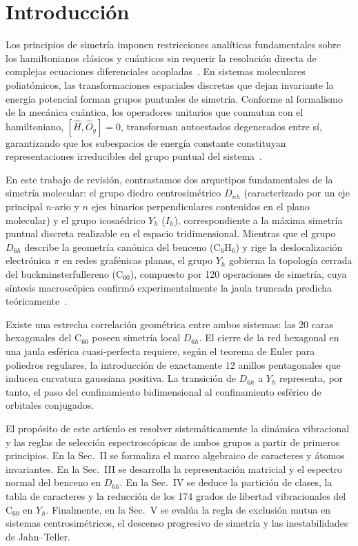 \enlargethispage{1.5\baselineskip}

\section{Introducción}
\label{sec:intro}
Los principios de simetría imponen restricciones analíticas fundamentales sobre los hamiltonianos clásicos y cuánticos sin requerir la resolución directa de complejas ecuaciones diferenciales acopladas~\cite{Ramadevi2019, LandauMechanics}. En sistemas moleculares poliatómicos, las transformaciones espaciales discretas que dejan invariante la energía potencial forman grupos puntuales de simetría. Conforme al formalismo de la mecánica cuántica, los operadores unitarios que conmutan con el hamiltoniano, $[\hat{H}, \hat{O}_g] = 0$, transforman autoestados degenerados entre sí, garantizando que los subespacios de energía constante constituyan representaciones irreducibles del grupo puntual del sistema~\cite{Wigner1959, Cotton2008, Dresselhaus2008}.

En este trabajo de revisión, contrastamos dos arquetipos fundamentales de la simetría molecular: el grupo diedro centrosimétrico $D_{nh}$ (caracterizado por un eje principal $n$-ario y $n$ ejes binarios perpendiculares contenidos en el plano molecular) y el grupo icosaédrico $Y_h$ ($I_h$), correspondiente a la máxima simetría puntual discreta realizable en el espacio tridimensional. Mientras que el grupo $D_{6h}$ describe la geometría canónica del benceno ($\text{C}_6\text{H}_6$) y rige la deslocalización electrónica $\pi$ en redes grafénicas planas, el grupo $Y_h$ gobierna la topología cerrada del buckminsterfullereno ($\text{C}_{60}$), compuesto por 120 operaciones de simetría, cuya síntesis macroscópica confirmó experimentalmente la jaula truncada predicha teóricamente~\cite{Kroto1985, Kratschmer1990}.

Existe una estrecha correlación geométrica entre ambos sistemas: las 20 caras hexagonales del $\text{C}_{60}$ poseen simetría local $D_{6h}$. El cierre de la red hexagonal en una jaula esférica cuasi-perfecta requiere, según el teorema de Euler para poliedros regulares, la introducción de exactamente 12 anillos pentagonales que inducen curvatura gaussiana positiva. La transición de $D_{6h}$ a $Y_h$ representa, por tanto, el paso del confinamiento bidimensional al confinamiento esférico de orbitales conjugados.

El propósito de este artículo es resolver sistemáticamente la dinámica vibracional y las reglas de selección espectroscópicas de ambos grupos a partir de primeros principios. En la Sec.~II se formaliza el marco algebraico de caracteres y átomos invariantes. En la Sec.~III se desarrolla la representación matricial y el espectro normal del benceno en $D_{6h}$. En la Sec.~IV se deduce la partición de clases, la tabla de caracteres y la reducción de los 174 grados de libertad vibracionales del $\text{C}_{60}$ en $Y_h$. Finalmente, en la Sec.~V se evalúa la regla de exclusión mutua en sistemas centrosimétricos, el descenso progresivo de simetría y las inestabilidades de Jahn--Teller.
